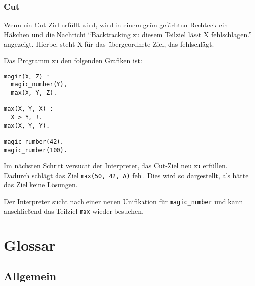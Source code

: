 \documentclass[parskip=full,11pt,twoside]{scrartcl}
\begin{document}
\begin{minipage}{\linewidth}
\end{minipage}

\subsubsection{Cut}

Wenn ein Cut-Ziel erfüllt wird, wird in einem grün gefärbten Rechteck ein Häkchen und die Nachricht \enquote{Backtracking zu diesem Teilziel lässt X fehlschlagen.} angezeigt.
Hierbei steht X für das übergeordnete Ziel, das fehlschlägt.

Das Programm zu den folgenden Grafiken ist:

\begin{lstlisting}
magic(X, Z) :-
  magic_number(Y),
  max(X, Y, Z).

max(X, Y, X) :-
  X > Y, !.
max(X, Y, Y).

magic_number(42).
magic_number(100).
\end{lstlisting}

\begin{minipage}{\linewidth}
\end{minipage}

Im nächsten Schritt versucht der Interpreter, das Cut-Ziel neu zu erfüllen.
Dadurch schlägt das Ziel \texttt{max(50, 42, A)} fehl.
Dies wird so dargestellt, als hätte das Ziel keine Lösungen.

\begin{minipage}{\linewidth}
\end{minipage}

Der Interpreter sucht nach einer neuen Unifikation für \texttt{magic\_number} und kann anschließend das Teilziel \texttt{max} wieder besuchen.

\section{Glossar}

\subsection{Allgemein}
\end{document}
